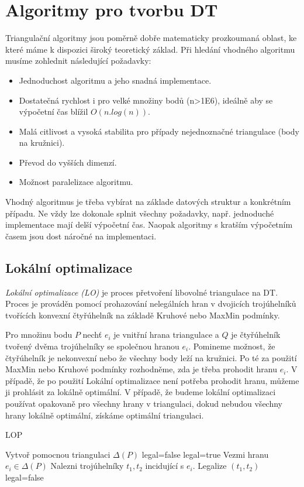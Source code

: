 \documentclass[12pt,a4paper]{article}
\begin{document}
\section{Algoritmy pro tvorbu DT}
Triangulační algoritmy jsou poměrně dobře matematicky prozkoumaná oblast, ke které máme k dispozici široký teoretický základ. Při hledání vhodného algoritmu musíme zohlednit následující požadavky:
\begin{itemize}
\item Jednoduchost algoritmu a jeho snadná implementace.
\item Dostatečná rychlost i pro velké množiny bodů (n>1E6), ideálně aby se výpočetní čas blížil $O(n . log(n))$.
\item Malá citlivost a vysoká stabilita pro případy nejednoznačné triangulace (body na kružnici).
\item Převod do vyšších dimenzí.
\item Možnost paralelizace algoritmu.
\end{itemize}
Vhodný algoritmus je třeba vybírat na základe datových struktur a konkrétním případu. Ne vždy lze dokonale splnit všechny požadavky, např. jednoduché implementace mají delší výpočetní čas. Naopak algoritmy s kratším výpočetním časem jsou dost náročné na implementaci.

\newpage
\subsection{Lokální optimalizace}
\emph{Lokální optimalizace (LO)} je proces přetvoření libovolné triangulace na DT. Proces je prováděn pomocí prohazování nelegálních hran v dvojicích trojúhelníků tvořících konvexní čtyřúhelník na základě Kruhové nebo MaxMin podmínky.

Pro množinu bodu $P$ nechť $e_i$ je vnitřní hrana triangulace a $Q$ je čtyřúhelník tvořený dvěma trojúhelníky se společnou hranou $e_i$. Pomineme možnost, že čtyřúhelník je nekonvexní nebo že všechny body leží na kružnici. Po té za použití MaxMin nebo Kruhové podmínky rozhodněme, zda je třeba prohodit hranu $e_i$. V případě, že po použití Lokální optimalizace není potřeba prohodit hranu, můžeme ji prohlásit za lokálně optimální. V případě, že  budeme lokální optimalizaci používat opakovaně pro všechny hrany v triangulaci, dokud nebudou všechny hrany lokálně optimální, získáme optimální triangulaci.

\begin{algorithm}
\caption{LOP}
\begin{algorithmic}[1]
\State Vytvoř pomocnou triangulaci $\Delta(P)$
\State legal=false
	\State legal=true
		\State Vezmi hranu $e_i \in \Delta(P)$
		\State Nalezni trojúhelníky $t_1,t_2$ incidující s $e_i$.
			\State Legalize $(t_1,t_2)$
			\State legal=false
		\EndIf
	\EndFor
\EndWhile	
\end{algorithmic}
\end{algorithm}
\end{document}
